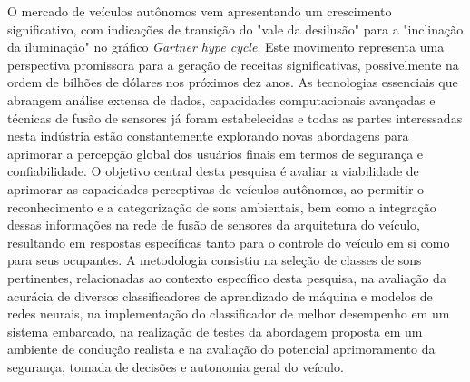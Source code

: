 \begin{resumo}

O mercado de veículos autônomos vem apresentando um crescimento significativo, com indicações de transição do "vale da desilusão" para a "inclinação da iluminação" no gráfico \textit{Gartner hype cycle}. Este movimento representa uma perspectiva promissora para a geração de receitas significativas, possivelmente na ordem de bilhões de dólares nos próximos dez anos. As tecnologias essenciais que abrangem análise extensa de dados, capacidades computacionais avançadas e técnicas de fusão de sensores já foram estabelecidas e todas as partes interessadas nesta indústria estão constantemente explorando novas abordagens para aprimorar a percepção global dos usuários finais em termos de segurança e confiabilidade. O objetivo central desta pesquisa é avaliar a viabilidade de aprimorar as capacidades perceptivas de veículos autônomos, ao permitir o reconhecimento e a categorização de sons ambientais, bem como a integração dessas informações na rede de fusão de sensores da arquitetura do veículo, resultando em respostas específicas tanto para o controle do veículo em si como para seus ocupantes. A metodologia consistiu na seleção de classes de sons pertinentes, relacionadas ao contexto específico desta pesquisa, na avaliação da acurácia de diversos classificadores de aprendizado de máquina e modelos de redes neurais, na implementação do classificador de melhor desempenho em um sistema embarcado, na realização de testes da abordagem proposta em um ambiente de condução realista e na avaliação do potencial aprimoramento da segurança, tomada de decisões e autonomia geral do veículo.

\end{resumo}